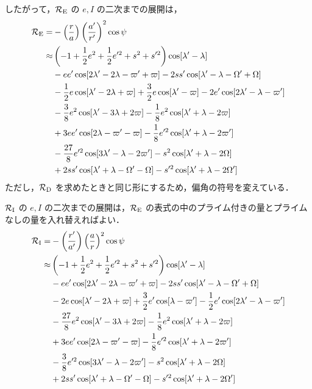 \documentclass[11pt,a4paper,oneside,onecolumn]{jarticle}
\begin{document}
したがって，${\cal R}_{\rm E}$ の $e, I$ の二次までの展開は，
\begin{equation}
\begin{split}
{\cal R}_{\rm E} = & - \left( \frac{r}{a} \right) \left( \frac{a'}{r'} \right)^2 \cos \psi \\
\approx & \left( -1 + \frac{1}{2} e^2 + \frac{1}{2} e'^2 + s^2 + s'^2 \right) \cos [\lambda' - \lambda] \\
& - e e' \cos [2 \lambda' - 2 \lambda - \varpi' + \varpi] - 2 s s' \cos [\lambda' - \lambda - \Omega' + \Omega] \\
& - \frac{1}{2} e \cos [\lambda' -2 \lambda + \varpi] + \frac{3}{2} e \cos [\lambda' - \varpi] - 2 e' \cos [2 \lambda' - \lambda - \varpi'] \\
& - \frac{3}{8} e^2 \cos [\lambda' - 3 \lambda + 2 \varpi] - \frac{1}{8} e^2 \cos [\lambda' + \lambda - 2 \varpi] \\
& + 3 e e' \cos [2 \lambda - \varpi' - \varpi] - \frac{1}{8} e'^2 \cos [\lambda' + \lambda - 2 \varpi'] \\
& - \frac{27}{8} e'^2 \cos [3 \lambda' - \lambda - 2 \varpi'] - s^2 \cos [\lambda' + \lambda - 2 \Omega] \\
& + 2 s s' \cos [\lambda' + \lambda - \Omega' - \Omega] - s'^2 \cos [\lambda' + \lambda - 2 \Omega']
\end{split} \label{eq:cal_RE(012)}
\end{equation}
ただし，${\cal R}_{\rm D}$ を求めたときと同じ形にするため，偏角の符号を変えている．

${\cal R}_{\rm I}$ の $e, I$ の二次までの展開は，${\cal R}_{\rm E}$ の表式の中のプライム付きの量とプライムなしの量を入れ替えればよい．
\begin{equation}
\begin{split}
{\cal R}_{\rm I} = & - \left( \frac{r'}{a'} \right) \left( \frac{a}{r} \right)^2 \cos \psi \\
\approx & \left( -1 + \frac{1}{2} e^2 + \frac{1}{2} e'^2 + s^2 + s'^2 \right) \cos [\lambda' - \lambda] \\
& - e e' \cos [2 \lambda' - 2 \lambda - \varpi' + \varpi] - 2 s s' \cos [\lambda' - \lambda - \Omega' + \Omega] \\
& -2 e \cos [\lambda' -2 \lambda + \varpi] + \frac{3}{2} e' \cos [\lambda - \varpi'] - \frac{1}{2} e' \cos [2 \lambda' - \lambda - \varpi'] \\
& - \frac{27}{8} e^2 \cos [\lambda' - 3 \lambda + 2 \varpi] - \frac{1}{8} e^2 \cos [\lambda' + \lambda - 2 \varpi] \\
& + 3 e e' \cos [2 \lambda - \varpi' - \varpi] - \frac{1}{8} e'^2 \cos [\lambda' + \lambda - 2 \varpi'] \\
& - \frac{3}{8} e'^2 \cos [3 \lambda' - \lambda - 2 \varpi'] - s^2 \cos [\lambda' + \lambda - 2 \Omega] \\
& + 2 s s' \cos [\lambda' + \lambda - \Omega' - \Omega] - s'^2 \cos [\lambda' + \lambda - 2 \Omega']
\end{split}
\end{equation}
\end{document}
